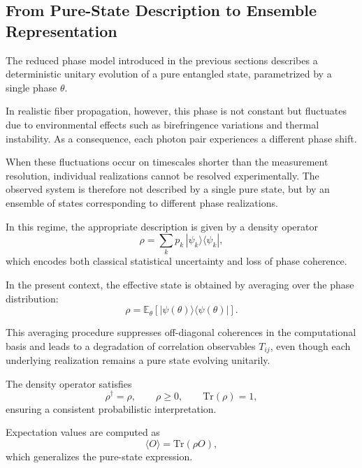 \documentclass[a4paper]{article}
\begin{document}

\subsection{From Pure-State Description to Ensemble Representation}

The reduced phase model introduced in the previous sections describes a deterministic unitary evolution of a pure entangled state, parametrized by a single phase \( \theta \).

In realistic fiber propagation, however, this phase is not constant but fluctuates due to environmental effects such as birefringence variations and thermal instability. As a consequence, each photon pair experiences a different phase shift.

\medskip

When these fluctuations occur on timescales shorter than the measurement resolution, individual realizations cannot be resolved experimentally. The observed system is therefore not described by a single pure state, but by an ensemble of states corresponding to different phase realizations.

\medskip

In this regime, the appropriate description is given by a density operator
\[
\rho = \sum_k p_k \, |\psi_k\rangle \langle \psi_k|,
\]
which encodes both classical statistical uncertainty and loss of phase coherence.

\medskip

In the present context, the effective state is obtained by averaging over the phase distribution:
\[
\rho = \mathbb{E}_{\theta}\!\left[ |\psi(\theta)\rangle \langle \psi(\theta)| \right].
\]

\medskip

This averaging procedure suppresses off-diagonal coherences in the computational basis and leads to a degradation of correlation observables \( T_{ij} \), even though each underlying realization remains a pure state evolving unitarily.

\medskip

The density operator satisfies
\[
\rho^\dagger = \rho,
\qquad
\rho \ge 0,
\qquad
\mathrm{Tr}(\rho) = 1,
\]
ensuring a consistent probabilistic interpretation.

\medskip

Expectation values are computed as
\[
\langle O \rangle = \mathrm{Tr}(\rho O),
\]
which generalizes the pure-state expression.
\end{document}
